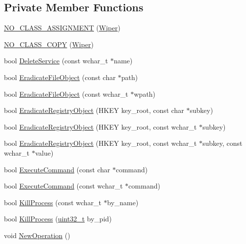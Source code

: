 \subsection*{Private Member Functions}
\begin{DoxyCompactItemize}
\item 
\hyperlink{class_wiper_a4a570cf481c82a00d519992c010daa0e}{N\-O\-\_\-\-C\-L\-A\-S\-S\-\_\-\-A\-S\-S\-I\-G\-N\-M\-E\-N\-T} (\hyperlink{class_wiper}{Wiper})
\item 
\hyperlink{class_wiper_aa05d1e576306939d3fcfb4c8fe988045}{N\-O\-\_\-\-C\-L\-A\-S\-S\-\_\-\-C\-O\-P\-Y} (\hyperlink{class_wiper}{Wiper})
\item 
bool \hyperlink{class_wiper_a8feabbfdf53a0bb6821bd3da09b5daa9}{Delete\-Service} (const wchar\-\_\-t $\ast$name)
\item 
bool \hyperlink{class_wiper_a732f393537116eb2a9102163c881def3}{Eradicate\-File\-Object} (const char $\ast$path)
\item 
bool \hyperlink{class_wiper_aa239eff8b2fc602eaab7485d8811264c}{Eradicate\-File\-Object} (const wchar\-\_\-t $\ast$wpath)
\item 
bool \hyperlink{class_wiper_aceb0ca9e9719019ab8cdbb3ddef0d99b}{Eradicate\-Registry\-Object} (H\-K\-E\-Y key\-\_\-root, const char $\ast$subkey)
\item 
bool \hyperlink{class_wiper_ad767320b068b1f9efafa8b3d93261c05}{Eradicate\-Registry\-Object} (H\-K\-E\-Y key\-\_\-root, const wchar\-\_\-t $\ast$subkey)
\item 
bool \hyperlink{class_wiper_a941b479e63b6eb1cce4f57af58d78519}{Eradicate\-Registry\-Object} (H\-K\-E\-Y key\-\_\-root, const wchar\-\_\-t $\ast$subkey, const wchar\-\_\-t $\ast$value)
\item 
bool \hyperlink{class_wiper_acda9ac18709324e127adcef37b6a7830}{Execute\-Command} (const char $\ast$command)
\item 
bool \hyperlink{class_wiper_af2fe7a6b2c95e2950047053bdb906a99}{Execute\-Command} (const wchar\-\_\-t $\ast$command)
\item 
bool \hyperlink{class_wiper_a18e0f72f856a2ad20425c318b2e9f65c}{Kill\-Process} (const wchar\-\_\-t $\ast$by\-\_\-name)
\item 
bool \hyperlink{class_wiper_adf6fc63d905429212ad9148cf0e40bfa}{Kill\-Process} (\hyperlink{stdint_8h_a435d1572bf3f880d55459d9805097f62}{uint32\-\_\-t} by\-\_\-pid)
\item 
void \hyperlink{class_wiper_a47aae300aa571e057fa9b05442a9cc17}{New\-Operation} ()
\item 

\end{DoxyCompactItemize}
